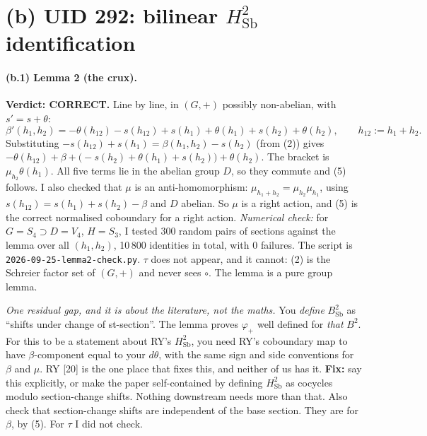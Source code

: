 \documentclass[11pt]{article}
\newcommand{\verdict}[1]{\textbf{Verdict: #1.}}
\begin{document}
\section*{(b) UID 292: bilinear $H^2_{\mathrm{Sb}}$ identification}

\paragraph{(b.1) Lemma 2 (the crux).} \verdict{CORRECT} Line by line, in $(G,+)$ possibly non-abelian, with
$s'=s+\theta$:
\[
\beta'(h_1,h_2)=-\theta(h_{12})-s(h_{12})+s(h_1)+\theta(h_1)+s(h_2)+\theta(h_2),\qquad h_{12}:=h_1+h_2 .
\]
Substituting $-s(h_{12})+s(h_1)=\beta(h_1,h_2)-s(h_2)$ (from (2)) gives
$-\theta(h_{12})+\beta+\bigl(-s(h_2)+\theta(h_1)+s(h_2)\bigr)+\theta(h_2)$. The bracket is $\mu_{h_2}\theta(h_1)$.
All five terms lie in the abelian group $D$, so they commute and (5) follows. I also checked that $\mu$ is an
anti-homomorphism: $\mu_{h_1+h_2}=\mu_{h_2}\mu_{h_1}$, using $s(h_{12})=s(h_1)+s(h_2)-\beta$ and $D$ abelian.
So $\mu$ is a right action, and (5) is the correct normalised coboundary for a right action. \emph{Numerical check:}
for $G=S_4\supset D=V_4$, $H=S_3$, I tested 300 random pairs of sections against the lemma over all $(h_1,h_2)$,
10\,800 identities in total, with 0 failures. The script is \texttt{2026-09-25-lemma2-check.py}. $\tau$ does not
appear, and it cannot: (2) is the Schreier factor set of $(G,+)$ and never sees $\circ$. The lemma is a pure
group lemma.

\emph{One residual gap, and it is about the literature, not the maths.} You \emph{define} $B^2_{\mathrm{Sb}}$ as
``shifts under change of st-section''. The lemma proves $\varphi_+$ well defined for \emph{that} $B^2$. For this
to be a statement about RY's $H^2_{\mathrm{Sb}}$, you need RY's coboundary map to have $\beta$-component equal to
your $d\theta$, with the same sign and side conventions for $\beta$ and $\mu$. RY [20] is the one place that
fixes this, and neither of us has it. \textbf{Fix:} say this explicitly, or make the paper self-contained by
defining $H^2_{\mathrm{Sb}}$ as cocycles modulo section-change shifts. Nothing downstream needs more than that.
Also check that section-change shifts are independent of the base section. They are for $\beta$, by (5). For
$\tau$ I did not check.
\end{document}
